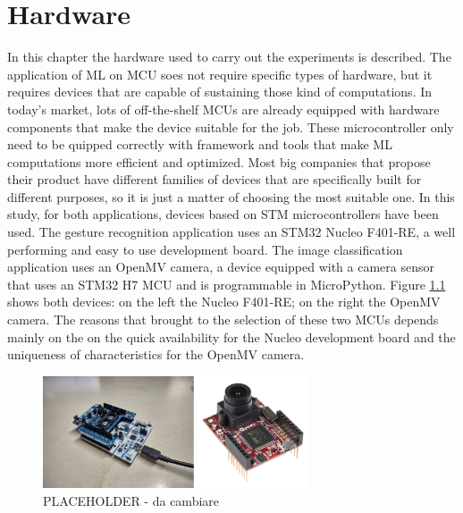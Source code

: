 \documentclass[12pt]{report}
\begin{document}
\chapter{Hardware} 
\label{chap:hardware}
In this chapter the hardware used to carry out the experiments is described. The application of ML on MCU soes not require specific types of hardware, but it requires devices that are capable of sustaining those kind of computations. In today's market, lots of off-the-shelf MCUs are already equipped with hardware components that make the device suitable for the job. These microcontroller only need to be quipped correctly with framework and tools that make ML computations more efficient and optimized. Most big companies that propose their product have different families of devices that are specifically built for different purposes, so it is just a matter of choosing the most suitable one. In this study, for both applications, devices based on STM microcontrollers have been used. The gesture recognition application uses an STM32 Nucleo F401-RE, a well performing and easy to use development board. The image classification application uses an OpenMV camera, a device equipped with a camera sensor that uses an STM32 H7 MCU and is programmable in MicroPython. Figure \ref{fig:hardware_all} shows both devices: on the left the Nucleo F401-RE; on the right the OpenMV camera. The reasons that brought to the selection of these two MCUs depends mainly on the on the quick availability for the Nucleo development board and the uniqueness of characteristics for the OpenMV camera.

\begin{figure}[h!]
    \centering
    \includegraphics[width=0.7\textwidth]{Figures/Chapter2/hardware.jpg} 
    \caption{PLACEHOLDER - da cambiare}
    \label{fig:hardware_all}    
\end{figure}
\end{document}
